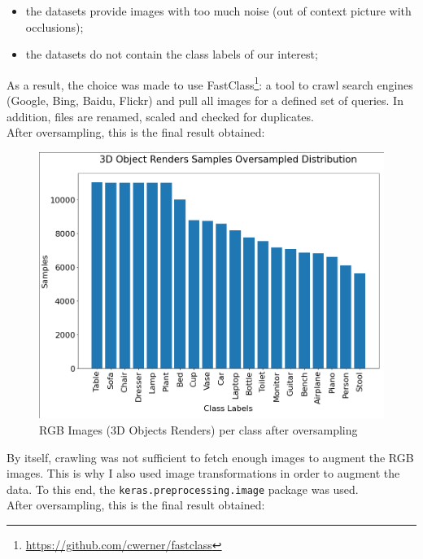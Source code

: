 \documentclass[11pt,a4paper]{article}
\begin{document}
\begin{itemize}
    \item the datasets provide images with too much noise (out of context picture with occlusions);
    \item the datasets do not contain the class labels of our interest;
\end{itemize}
As a result, the choice was made to use FastClass\footnote{\url{https://github.com/cwerner/fastclass}}: a tool to crawl search engines (Google, Bing, Baidu, Flickr) and pull all images for a defined set of queries. In addition, files are renamed, scaled and checked for duplicates.\\
After oversampling, this is the final result obtained:
\begin{figure}[H]
    \centering
    \includegraphics[scale=0.35]{imgs/3d-object-renders-crawling-oversampled-distribution.png}
    \caption{RGB Images (3D Objects Renders) per class after oversampling}
    \label{rgb-images-balancing}
\end{figure}
\noindent
By itself, crawling was not sufficient to fetch enough images to augment the RGB images. This is why I also used image transformations in order to augment the data. To this end, the \texttt{keras.preprocessing.image} package was used.\\
After oversampling, this is the final result obtained:
\end{document}
